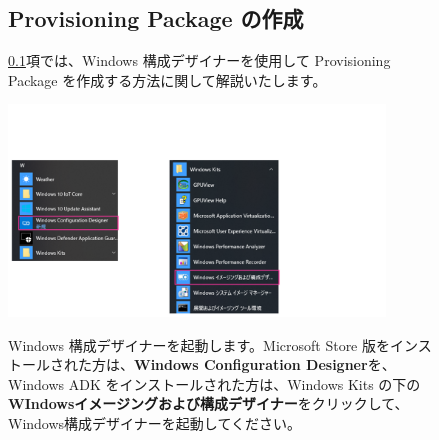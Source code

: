 \newpage

\begin{figure}[htbp]
    \subsection{Provisioning Package の作成}
    \label{sec:ProvisioningPackageの作成2}

    \hspace{8pt} \ref{sec:ProvisioningPackageの作成2}項では、Windows 構成デザイナーを使用して Provisioning Package を作成する方法に関して解説いたします。
\end{figure}

\begin{figure}[hp]
    \begin{minipage}{0.6\textwidth}
        \vspace{-1.5cm}
        \includegraphics[width=10cm]{figures/MakeProvisioningPackage-01}
    \end{minipage}
    \begin{minipage}{0.4\textwidth}
        Windows 構成デザイナーを起動します。Microsoft Store 版をインストールされた方は、\textbf{Windows Configuration Designer}を、Windows ADK をインストールされた方は、Windows Kits の下の\textbf{WIndowsイメージングおよび構成デザイナー}をクリックして、Windows構成デザイナーを起動してください。
    \end{minipage}
\end{figure}

